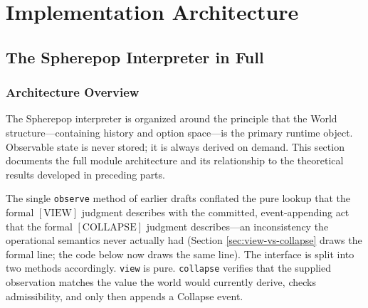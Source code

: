 \documentclass[12pt, a4paper, openany]{book}
\theoremstyle{plain}
\theoremstyle{definition}
\theoremstyle{remark}
\begin{document}
\part{Implementation Architecture}

\chapter{The Spherepop Interpreter in Full}

\section{Architecture Overview}

The Spherepop interpreter is organized around the principle that the World
structure---containing history and option space---is the primary runtime
object. Observable state is never stored; it is always derived on demand.
This section documents the full module architecture and its relationship to
the theoretical results developed in preceding parts.

The single \texttt{observe} method of earlier drafts conflated the pure lookup
that the formal $[\mathrm{VIEW}]$ judgment describes with the committed,
event-appending act that the formal $[\mathrm{COLLAPSE}]$ judgment describes---an
inconsistency the operational semantics never actually had (Section
\ref{sec:view-vs-collapse} draws the formal line; the code below now draws the
same line). The interface is split into two methods accordingly. \texttt{view}
is pure. \texttt{collapse} verifies that the supplied observation matches the
value the world would currently derive, checks admissibility, and only then
appends a Collapse event.
\end{document}
